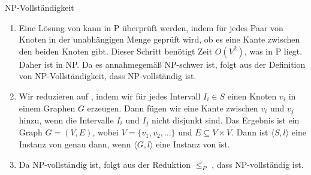 \documentclass{article}
\begin{document}
\begin{exercise}{NP-Vollständigkeit}
  \begin{solution}
    \begin{enumerate}
      \item Eine Lösung von  kann in P überprüft werden, indem für jedes Paar von Knoten in der unabhängigen Menge geprüft wird, ob es eine Kante zwischen den beiden Knoten gibt. Dieser Schritt benötigt Zeit $O(V^2)$, was in P liegt. Daher ist  in NP. Da es annahmegemäß NP-schwer ist, folgt aus der Definition von NP-Vollständigkeit, dass  NP-vollständig ist.
      \item Wir reduzieren  auf , indem wir für jedes Intervall $I_i \in S$ einen Knoten $v_i$ in einem Graphen $G$ erzeugen. Dann fügen wir eine Kante zwischen $v_i$ und $v_j$ hinzu, wenn die Intervalle $I_i$ und $I_j$ nicht disjunkt sind. Das Ergebnis ist ein Graph $G = (V,E)$, wobei $V = \{v_1, v_2, \dots\}$ und $E \subseteq V \times V$. Dann ist $\langle S, l \rangle$ eine Instanz von  genau dann, wenn $\langle G, l \rangle$ eine Instanz von  ist.
      \item Da  NP-vollständig ist, folgt aus der Reduktion  $\leq_P$ , dass  NP-vollständig ist.
    \end{enumerate}
  \end{solution}
\end{exercise}
\end{document}
